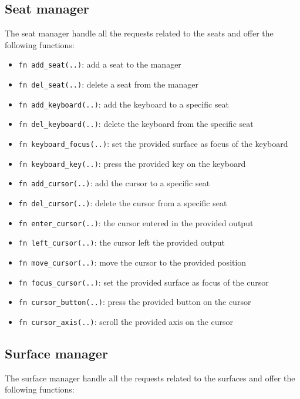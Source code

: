 \subsection{Seat manager}
The seat manager handle all the requests related to the seats and offer the following functions:
\begin{itemize}
	\item \lstinline|fn add_seat(..)|: add a seat to the manager
	\item \lstinline|fn del_seat(..)|: delete a seat from the manager
	\item \lstinline|fn add_keyboard(..)|: add the keyboard to a specific seat
	\item \lstinline|fn del_keyboard(..)|: delete the keyboard from the specific seat
	\item \lstinline|fn keyboard_focus(..)|: set the provided surface as focus of the keyboard
	\item \lstinline|fn keyboard_key(..)|: press the provided key on the keyboard
	\item \lstinline|fn add_cursor(..)|: add the cursor to a specific seat
	\item \lstinline|fn del_cursor(..)|: delete the cursor from a specific seat
	\item \lstinline|fn enter_cursor(..)|: the cursor entered in the provided output
	\item \lstinline|fn left_cursor(..)|: the cursor left the provided output
	\item \lstinline|fn move_cursor(..)|: move the cursor to the provided position
	\item \lstinline|fn focus_cursor(..)|: set the provided surface as focus of the cursor
	\item \lstinline|fn cursor_button(..)|: press the provided button on the cursor
	\item \lstinline|fn cursor_axis(..)|: scroll the provided axis on the cursor
\end{itemize}
\subsection{Surface manager}
The surface manager handle all the requests related to the surfaces and offer the following functions:

